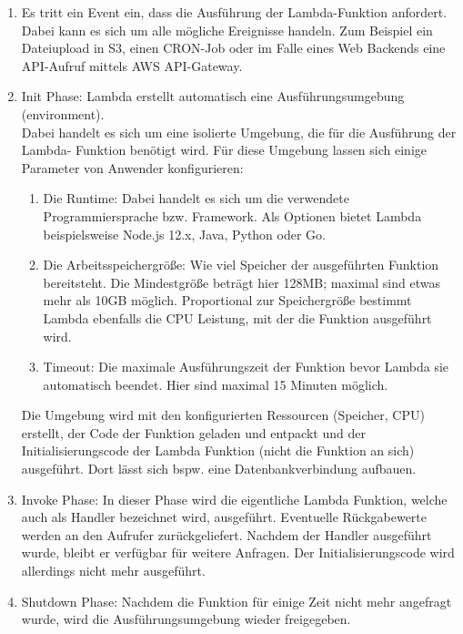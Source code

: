 \begin{enumerate}
\item Es tritt ein Event ein, dass die Ausführung der Lambda-Funktion anfordert. \\
    Dabei kann es sich um alle mögliche Ereignisse handeln. Zum Beispiel ein Dateiupload in S3, einen CRON-Job oder im Falle eines Web Backends eine API-Aufruf mittels AWS API-Gateway.

\item Init Phase: Lambda erstellt automatisch eine Ausführungsumgebung (environment). \\
    Dabei handelt es sich um eine isolierte Umgebung, die für die Ausführung der Lambda- Funktion benötigt wird. Für diese Umgebung lassen sich einige Parameter von Anwender konfigurieren:
    
    \begin{enumerate}
        \item Die Runtime: Dabei handelt es sich um die verwendete Programmiersprache bzw. Framework. Als Optionen bietet Lambda beispielsweise Node.js 12.x, Java, Python oder Go.
        \item Die Arbeitsspeichergröße: Wie viel Speicher der ausgeführten Funktion bereitsteht. Die Mindestgröße beträgt hier 128MB; maximal sind etwas mehr als 10GB möglich. Proportional zur Speichergröße bestimmt Lambda ebenfalls die CPU Leistung, mit der die Funktion ausgeführt wird.
        \item Timeout: Die maximale Ausführungszeit der Funktion bevor Lambda sie automatisch beendet. Hier sind maximal 15 Minuten möglich.
    \end{enumerate}
    
    Die Umgebung wird mit den konfigurierten Ressourcen (Speicher, CPU) erstellt, der Code der Funktion geladen und entpackt und der Initialisierungscode der Lambda Funktion (nicht die Funktion an sich) ausgeführt. Dort lässt sich bspw. eine Datenbankverbindung aufbauen.
    
\item Invoke Phase: In dieser Phase wird die eigentliche Lambda Funktion, welche auch als Handler bezeichnet wird, ausgeführt. Eventuelle Rückgabewerte werden an den Aufrufer zurückgeliefert. Nachdem der Handler ausgeführt wurde, bleibt er verfügbar für weitere Anfragen. Der Initialisierungscode wird allerdings nicht mehr ausgeführt.
    
\item Shutdown Phase: Nachdem die Funktion für einige Zeit nicht mehr angefragt wurde, wird die Ausführungsumgebung wieder freigegeben. 
\end{enumerate}

